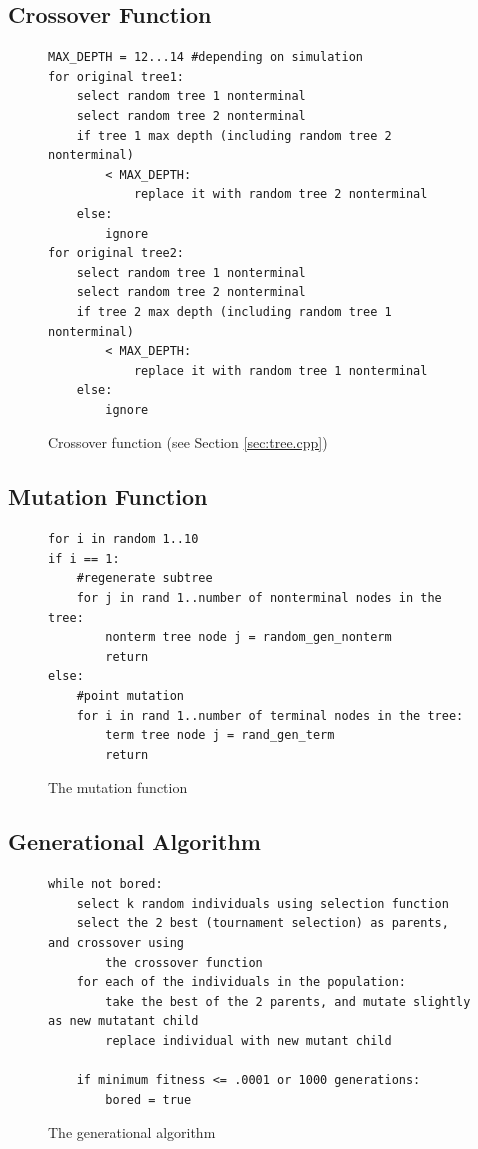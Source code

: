 \documentclass[12pt]{article}
\begin{document}
\subsection{Crossover Function}
\label{sec:crossover}
\begin{figure}[!h]
        \begin{center}
		\begin{lstlisting}
MAX_DEPTH = 12...14 #depending on simulation
for original tree1:
	select random tree 1 nonterminal
	select random tree 2 nonterminal
	if tree 1 max depth (including random tree 2 nonterminal) 
		< MAX_DEPTH:
			replace it with random tree 2 nonterminal
	else:
		ignore
for original tree2:
	select random tree 1 nonterminal
	select random tree 2 nonterminal
	if tree 2 max depth (including random tree 1 nonterminal) 
		< MAX_DEPTH:
			replace it with random tree 1 nonterminal
	else:
		ignore
		\end{lstlisting}
               \caption{Crossover function (see Section \ref{sec:tree.cpp})}
                \label{fit_func}
        \end{center}
\end{figure}

\subsection{Mutation Function}
\label{sec:mutation}
\begin{figure}[!h]
        \begin{center}
		\scriptsize
		\begin{lstlisting}
for i in random 1..10
if i == 1:
	#regenerate subtree
	for j in rand 1..number of nonterminal nodes in the tree:
		nonterm tree node j = random_gen_nonterm
		return
else:
	#point mutation
	for i in rand 1..number of terminal nodes in the tree:
		term tree node j = rand_gen_term
		return
		\end{lstlisting}
		\normalsize
               \caption{The mutation function}
                \label{mut_func}
        \end{center}
\end{figure}

\subsection{Generational Algorithm}
\label{sec:gen_alg}
\begin{figure}[!h]
        \begin{center}
		\scriptsize
		\begin{lstlisting}
while not bored:
	select k random individuals using selection function
	select the 2 best (tournament selection) as parents, and crossover using
		the crossover function
	for each of the individuals in the population:
		take the best of the 2 parents, and mutate slightly as new mutatant child
		replace individual with new mutant child

	if minimum fitness <= .0001 or 1000 generations:
		bored = true
		\end{lstlisting}
		\normalsize
               \caption{The generational algorithm}
                \label{gen_alg}
        \end{center}
\end{figure}
\end{document}
